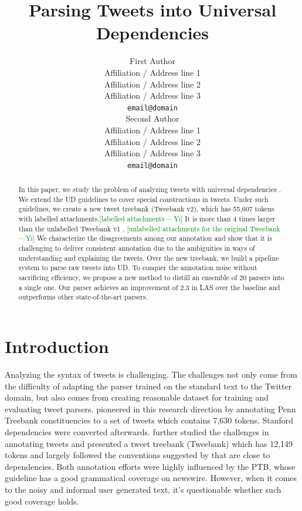 \documentclass[11pt,a4paper]{article}
\title{Parsing Tweets into Universal Dependencies}
\author{First Author \\
  Affiliation / Address line 1 \\
  Affiliation / Address line 2 \\
  Affiliation / Address line 3 \\
  {\tt email@domain} \\\And
  Second Author \\
  Affiliation / Address line 1 \\
  Affiliation / Address line 2 \\
  Affiliation / Address line 3 \\
  {\tt email@domain} \\}
\date{}
\newcommand{\yicomment}[1]{\textcolor{green}{[#1 ---\textsc{Yi}]}}
\begin{document}
\maketitle
\begin{abstract}
In this paper, we study the problem of analyzing tweets with
universal dependencies \citep[UD]{NIVRE16.348}. We extend the UD guidelines to cover
special constructions in tweets. Under such guidelines, we create
a new tweet treebank ({\sc Tweebank v2}), which has 55,607 tokens with labelled attachments.\yicomment{labelled attachments}
It is more than 4 times larger than the unlabelled {\sc Tweebank v1} \citep{kong-EtAl:2014:EMNLP2014}. \yicomment{unlabelled attachments for the original Tweebank}
We characterize the disagreements
among our annotation and show that it is challenging to deliver
consistent annotation due to the ambiguities in ways of
understanding and explaining the tweets. Over the new treebank,
we build a pipeline system to parse raw tweets into UD. To conquer the
annotation noise without sacrificing efficiency, we propose a new
method to distill an ensemble of 20 parsers into a single one. Our
parser achieves an improvement of 2.3 in LAS over the baseline
and outperforms other state-of-the-art parsers.
\end{abstract}

\section{Introduction}
Analyzing the syntax of tweets is challenging. The challenges not
only come from the difficulty of adapting the parser trained on the
standard text to the Twitter domain, but also comes from creating
reasonable dataset for training and evaluating tweet parsers. 
\citet{AAAIW113912} pioneered in this research direction by
annotating Penn Treebank \citep[PTB]{Marcus93buildinga}
constituencies to a set of tweets which contains 7,630 tokens. 
Stanford dependencies were converted afterwards. 
\citet{kong-EtAl:2014:EMNLP2014} further studied the challenges in
annotating tweets and presented a tweet treebank ({\sc Tweebank})
which has 12,149 tokens and largely followed the conventions
suggested by \citet{schneider-EtAl:2013:LAW7-ID} that are close to 
\citet{Yamada03statisticaldependency} dependencies. 
Both annotation efforts were highly influenced by the PTB, whose guideline
has a good grammatical coverage on newswire. However, when it comes
to the noisy and informal user generated text, it's questionable
whether such good coverage holds.
\end{document}
